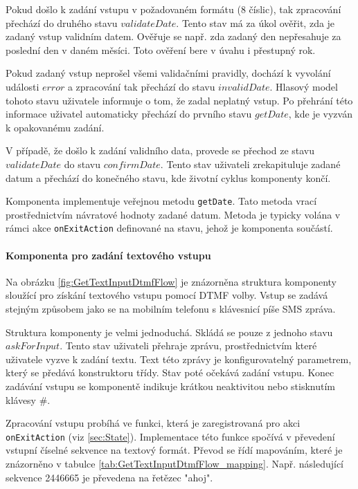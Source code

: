 \documentclass[ing,male,java,dept460,twoside]{diploma}						%
\begin{document}
Pokud došlo k zadání vstupu v požadovaném formátu (8 číslic), tak zpracování přechází do druhého stavu $validateDate$. Tento stav má za úkol ověřit, zda je zadaný vstup validním datem. Ověřuje se např. zda zadaný den nepřesahuje za poslední den v daném měsíci. Toto ověření bere v úvahu i přestupný rok.

Pokud zadaný vstup neprošel všemi validačními pravidly, dochází k vyvolání události $error$ a zpracování tak přechází do stavu $invalidDate$. Hlasový model tohoto stavu uživatele informuje o tom, že zadal neplatný vstup. Po přehrání této informace uživatel automaticky přechází do prvního stavu $getDate$, kde je vyzván k opakovanému zadání.

V případě, že došlo k zadání validního data, provede se přechod ze stavu $validateDate$ do stavu $confirmDate$. Tento stav uživateli zrekapituluje zadané datum a přechází do konečného stavu, kde životní cyklus komponenty končí.

Komponenta implementuje veřejnou metodu \texttt{getDate}. Tato metoda vrací prostřednictvím návratové hodnoty zadané datum. Metoda je typicky volána v rámci akce \texttt{onExitAction} definované na stavu, jehož je komponenta součástí.


\paragraph{Komponenta pro zadání textového vstupu}
\label{sec:GetTextInputDtmfFlow}
Na obrázku \ref{fig:GetTextInputDtmfFlow} je znázorněna struktura komponenty sloužící pro získání textového vstupu pomocí DTMF volby. Vstup se zadává stejným způsobem jako se na mobilním telefonu s klávesnicí píše SMS zpráva.

Struktura komponenty je velmi jednoduchá. Skládá se pouze z jednoho stavu $askForInput$. Tento stav uživateli přehraje zprávu, prostřednictvím které uživatele vyzve k zadání textu. Text této zprávy je konfigurovatelný parametrem, který se předává konstruktoru třídy. Stav poté očekává zadání vstupu. Konec zadávání vstupu se komponentě indikuje krátkou neaktivitou nebo stisknutím klávesy \#.

Zpracování vstupu probíhá ve funkci, která je zaregistrovaná pro akci \texttt{onExitAction} (viz \ref{sec:State}). Implementace této funkce spočívá v převedení vstupní číselné sekvence na textový formát. Převod se řídí mapováním, které je znázorněno v tabulce \ref{tab:GetTextInputDtmfFlow_mapping}. Např. následující sekvence 2446665 je převedena na řetězec "ahoj".
\end{document}
